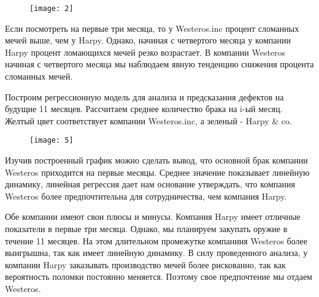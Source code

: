 \documentclass{beamer}
\begin{document}
\begin{frame}

\begin{figure}[t]
	\centering
	\texttt{[image: 2]}
\end{figure}

\end{frame}

\begin{frame}
Если посмотреть на первые три месяца, то у Westeros.inc процент сломанных мечей выше, чем у Harpy. Однако, начиная с четвертого месяца у компании Harpy процент ломающихся мечей резко возрастает. В компании Westeros начиная с четвертого месяца мы наблюдаем явную тенденцию снижения процента сломанных мечей. 
\end{frame}

\begin{frame}
Построим регрессионную модель для анализа и предсказания дефектов на будущие 11 месяцев. Рассчитаем среднее количество брака на i-ый месяц. Желтый цвет соответствует компании Westeros.inc, а зеленый - Harpy & co.
\end{frame}

\begin{frame}

\begin{figure}[t]
\centering
\texttt{[image: 5]}
\end{figure}
\end{frame}

\begin{frame}
Изучив построенный график можно сделать вывод, что основной брак компании Westeros приходится на первые месяцы. Среднее значение показывает линейную динамику, линейная регрессия дает нам основание утверждать, что компания Westeros более предпочтительна для сотрудничества, чем компания Harpy.
\end{frame}

\begin{frame}
Обе компании имеют свои плюсы и минусы. Компания Harpy имеет отличные показатели в первые три месяца. Однако, мы планируем закупать оружие в течение 11 месяцев. На этом длительном промежутке компаниия Westeros более выигрышна, так как имеет линейную динамику. В силу проведенного анализа,  у компании Harpy заказывать производство мечей более рискованно, так как вероятность поломки постоянно меняется. Поэтому свое предпочтение мы отдаем Westeros.
\end{frame}
\end{document}
